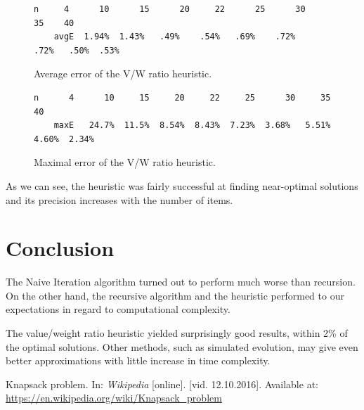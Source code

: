 \documentclass[a4paper,10pt,twocolumn]{article}
\begin{document}
\begin{figure}[H]
    \begin{lstlisting}[basicstyle=\scriptsize]
    n     4      10      15      20     22      25      30     35    40
    avgE  1.94%  1.43%   .49%    .54%   .69%    .72%    .72%   .50%  .53%
    \end{lstlisting}
    \caption{Average error of the V/W ratio heuristic.}\label{vwratioavgerr}
\end{figure}

\begin{figure}[H]
    \begin{lstlisting}[basicstyle=\scriptsize]
    n      4      10     15     20     22     25      30     35     40
    maxE   24.7%  11.5%  8.54%  8.43%  7.23%  3.68%   5.51%  4.60%  2.34%
    \end{lstlisting}
    \caption{Maximal error of the V/W ratio heuristic.}\label{vwratiomaxerr}
\end{figure}

As we can see, the heuristic was fairly successful at finding near-optimal solutions and its precision increases with
the number of items.


\section{Conclusion} %
The Naive Iteration algorithm turned out to perform much worse than recursion. On the other hand, the recursive
algorithm and the heuristic performed to our expectations in regard to computational complexity.

The value/weight ratio heuristic yielded surprisingly good results, within 2\% of the optimal solutions. Other methods,
such as simulated evolution, may give even better approximations with little increase in time complexity.

\begin{thebibliography}{9}
        Knapsack problem.
        In: \textit {Wikipedia} [online].
        [vid. 12.10.2016]. Available at:
        \url{https://en.wikipedia.org/wiki/Knapsack_problem}
\end{thebibliography}
\end{document}
